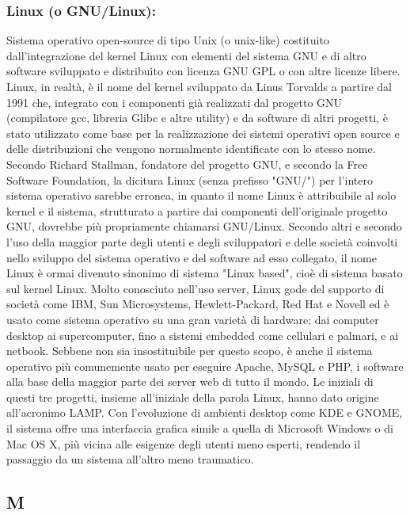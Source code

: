 \subsubsection{Linux (o GNU/Linux):} Sistema operativo open-source di
tipo Unix (o unix-like) costituito dall'integrazione del kernel Linux con
elementi del sistema GNU e di altro software sviluppato e distribuito con
licenza GNU GPL o con altre licenze libere. Linux, in realt\`a, \`e il nome del
kernel sviluppato da Linus Torvalds a partire dal 1991 che, integrato con i
componenti gi\`a realizzati dal progetto GNU (compilatore gcc, libreria Glibc e
altre utility) e da software di altri progetti, \`e stato utilizzato come base per
la realizzazione dei sistemi operativi open source e delle distribuzioni che
vengono normalmente identificate con lo stesso nome. Secondo Richard Stallman,
fondatore del progetto GNU, e secondo la Free Software Foundation, la dicitura
Linux (senza prefisso "GNU/") per l'intero sistema operativo sarebbe erronea, in
quanto il nome Linux \`e attribuibile al solo kernel e il sistema, strutturato a
partire dai componenti dell'originale progetto GNU, dovrebbe pi\`u propriamente
chiamarsi GNU/Linux. Secondo altri e secondo l'uso della maggior parte degli
utenti e degli sviluppatori e delle societ\`a coinvolti nello sviluppo del sistema
operativo e del software ad esso collegato, il nome Linux \`e ormai divenuto
sinonimo di sistema "Linux based", cio\`e di sistema basato sul kernel Linux.
Molto conosciuto nell'uso server, Linux gode del supporto di societ\`a come IBM,
Sun Microsystems, Hewlett-Packard, Red Hat e Novell ed \`e usato come sistema
operativo su una gran variet\`a di hardware; dai computer desktop ai
supercomputer, fino a sistemi embedded come cellulari e palmari, e ai netbook.
Sebbene non sia insostituibile per questo scopo, \`e anche il sistema operativo
pi\`u comunemente usato per eseguire Apache, MySQL e PHP, i software alla base
della maggior parte dei server web di tutto il mondo. Le iniziali di questi tre
progetti, insieme all'iniziale della parola Linux, hanno dato origine
all'acronimo LAMP. Con l'evoluzione di ambienti desktop come KDE e GNOME, il
sistema offre una interfaccia grafica simile a quella di Microsoft Windows o di
Mac OS X, pi\`u vicina alle esigenze degli utenti meno esperti, rendendo il
passaggio da un sistema all'altro meno traumatico.

\subsection*{\huge{M}}
